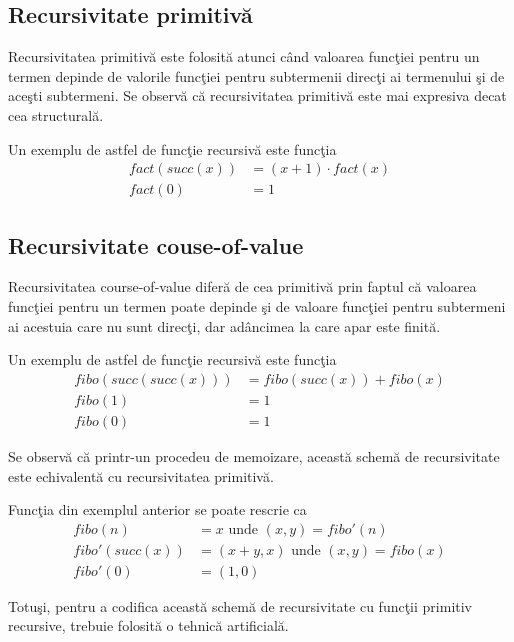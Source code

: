 \subsection{Recursivitate primitiv\u a}
Recursivitatea primitiv\u a este folosit\u a atunci c\^ and valoarea func\c tiei pentru un termen depinde de valorile func\c tiei pentru subtermenii direc\c ti ai termenului \c si de ace\c sti subtermeni. Se observ\u a c\u a recursivitatea primitiv\u a este mai expresiva decat cea structural\u a.

\begin{example}
Un exemplu de astfel de func\c tie recursiv\u a este func\c tia
\begin{align*}
fact(succ(x)) &= (x+1) \cdot fact(x)\\
      fact(0) &= 1
\end{align*}
\end{example}

\subsection{Recursivitate couse-of-value}
\done{}
Recursivitatea {course-of-value} difer\u a de cea primitiv\u a prin faptul c\u a valoarea func\c tiei pentru un termen poate depinde \c si de valoare func\c tiei pentru subtermeni ai acestuia care nu sunt direc\c ti, dar ad\^ ancimea la care apar este finit\u a.

\begin{example}
Un exemplu de astfel de func\c tie recursiv\u a este func\c tia
\begin{align*}
fibo(succ(succ(x))) &= fibo(succ(x)) + fibo(x)\\
      fibo(1) &= 1 \\
      fibo(0) &= 1
\end{align*}
\end{example}

Se observ\u a c\u a printr-un procedeu de memoizare, aceast\u a schem\u a de recursivitate este echivalent\u a cu recursivitatea primitiv\u a.
\begin{example}
Func\c tia din exemplul anterior se poate rescrie ca
\begin{align*}
fibo(n) &= x \text{ unde } (x,y) = fibo'(n)\\
fibo'(succ(x)) &= (x+y, x) \text{ unde } (x,y) = fibo(x)\\
      fibo'(0) &= (1,0)
\end{align*}
\end{example}
Totu\c si, pentru a codifica aceast\u a schem\u a de recursivitate cu func\c tii primitiv recursive, trebuie folosit\u a o tehnic\u a  artificial\u a.
